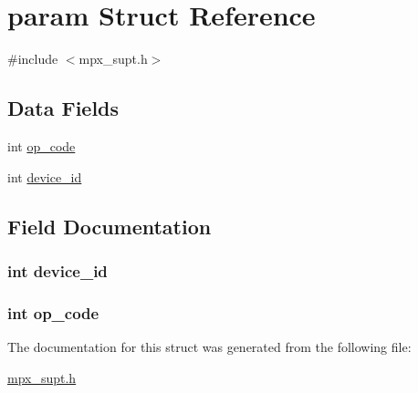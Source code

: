 \hypertarget{structparam}{}\section{param Struct Reference}
\label{structparam}


{\ttfamily \#include $<$mpx\+\_\+supt.\+h$>$}

\subsection*{Data Fields}
\begin{DoxyCompactItemize}
\item 
int \hyperlink{structparam_ab3dee384d0abe30d9ff31e204430241d}{op\+\_\+code}
\item 
int \hyperlink{structparam_accfd0301c469314772cc651ec198d492}{device\+\_\+id}
\end{DoxyCompactItemize}


\subsection{Field Documentation}
\hypertarget{structparam_accfd0301c469314772cc651ec198d492}{}
\subsubsection[{device\+\_\+id}]{\setlength{\rightskip}{0pt plus 5cm}int device\+\_\+id}\label{structparam_accfd0301c469314772cc651ec198d492}
\hypertarget{structparam_ab3dee384d0abe30d9ff31e204430241d}{}
\subsubsection[{op\+\_\+code}]{\setlength{\rightskip}{0pt plus 5cm}int op\+\_\+code}\label{structparam_ab3dee384d0abe30d9ff31e204430241d}


The documentation for this struct was generated from the following file\+:\begin{DoxyCompactItemize}
\item 
\hyperlink{mpx__supt_8h}{mpx\+\_\+supt.\+h}\end{DoxyCompactItemize}
